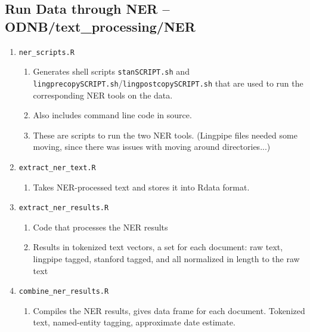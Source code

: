 \documentclass[11pt]{article}
\newcommand{\filename}[1]{\texttt{#1}}
\begin{document}
\subsection{Run Data through NER -- ODNB/text\_processing/NER}
\begin{enumerate}

\item \filename{ner\_scripts.R} 
\begin{enumerate}
\item Generates shell scripts \filename{stanSCRIPT.sh} and \filename{lingprecopySCRIPT.sh}/\filename{lingpostcopySCRIPT.sh} that are used to run the corresponding NER tools on the data. 
\item Also includes command line code in source. 
\item These are scripts to run the two NER tools. (Lingpipe files needed some moving, since there was issues with moving around directories...)
\end{enumerate}

\item \filename{extract\_ner\_text.R}
\begin{enumerate}
\item Takes NER-processed text and stores it into Rdata format. 
\end{enumerate}

\item \filename{extract\_ner\_results.R}
\begin{enumerate}
\item Code that processes the NER results
\item Results in tokenized text vectors, a set for each document: raw text, lingpipe tagged, stanford tagged, and all normalized in length to the raw text
\end{enumerate}

\item \filename{combine\_ner\_results.R}
\begin{enumerate}
\item Compiles the NER results, gives data frame for each document. Tokenized text, named-entity tagging, approximate date estimate. 
\end{enumerate}

\end{enumerate}
\end{document}
